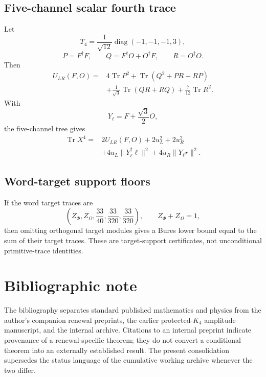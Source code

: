 \documentclass[11pt,oneside,openany]{book}
\numberwithin{equation}{chapter}
\theoremstyle{definition}
\theoremstyle{remark}
\newcommand{\Tr}{\operatorname{Tr}}
\newcommand{\diag}{\operatorname{diag}}
\newcommand{\norm}[1]{\lVert #1\rVert}
\begin{document}
\section{Five-channel scalar fourth trace}

Let
\[
 T_4=\frac1{\sqrt{12}}\diag(-1,-1,-1,3),
\]
\[
 P=F^\dagger F,
 \qquad
 Q=F^\dagger O+O^\dagger F,
 \qquad
 R=O^\dagger O.
\]
Then
\[
 \boxed{
 \begin{aligned}
 U_{LR}(F,O)
 ={}&
 4\Tr P^2
 +
 \Tr(Q^2+PR+RP)\\
 &+
 \frac1{\sqrt3}\Tr(QR+RQ)
 +
 \frac7{12}\Tr R^2.
 \end{aligned}}
\]
With
\[
 Y_\ell=F+\frac{\sqrt3}{2}O,
\]
the five-channel tree gives
\[
 \boxed{
 \begin{aligned}
 \Tr X^4
 ={}&
 2U_{LR}(F,O)
 +
 2u_L^2+2u_R^2\\
 &+
 4u_L\norm{Y_\ell^\dagger\ell}^2
 +
 4u_R\norm{Y_\ell r}^2.
 \end{aligned}}
\]

\section{Word-target support floors}

If the word target traces are
\[
 \left(
 Z_\Phi,Z_\Omega,
 \frac{33}{40},
 \frac{33}{320},
 \frac{33}{320}
 \right),
 \qquad
 Z_\Phi+Z_\Omega=1,
\]
then omitting orthogonal target modules gives a Bures lower bound equal to
the sum of their target traces.  These are target-support certificates, not
unconditional primitive-trace identities.


\backmatter
\chapter*{Bibliographic note}
The bibliography separates standard published mathematics and physics from the author's companion renewal preprints, the earlier protected-\(K_4\) amplitude manuscript, and the internal archive.  Citations to an internal preprint indicate provenance of a renewal-specific theorem; they do not convert a conditional theorem into an externally established result.  The present consolidation supersedes the status language of the cumulative working archive whenever the two differ.



\end{document}
